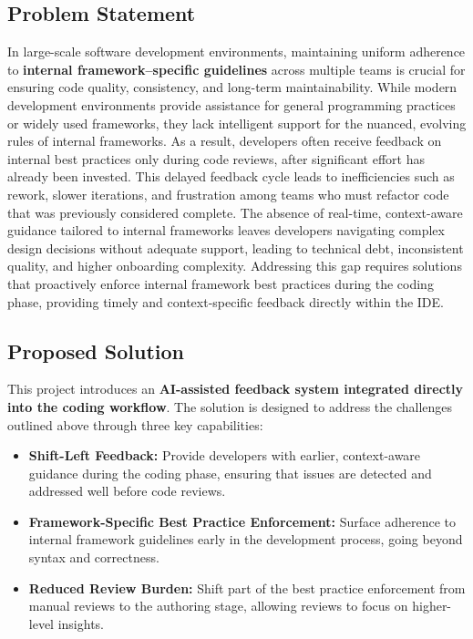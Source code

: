 \begin{spacing}{1.2}
\subsection{Problem Statement}
In large-scale software development environments, maintaining uniform adherence to \textbf{internal framework–specific guidelines} across multiple teams is crucial for ensuring code quality, consistency, and long-term maintainability. While modern development environments provide assistance for general programming practices or widely used frameworks, they lack intelligent support for the nuanced, evolving rules of internal frameworks. As a result, developers often receive feedback on internal best practices only during code reviews, after significant effort has already been invested. This delayed feedback cycle leads to inefficiencies such as rework, slower iterations, and frustration among teams who must refactor code that was previously considered complete. The absence of real-time, context-aware guidance tailored to internal frameworks leaves developers navigating complex design decisions without adequate support, leading to technical debt, inconsistent quality, and higher onboarding complexity. Addressing this gap requires solutions that proactively enforce internal framework best practices during the coding phase, providing timely and context-specific feedback directly within the IDE.  

\subsection{Proposed Solution}
This project introduces an \textbf{AI-assisted feedback system integrated directly into the coding workflow}. The solution is designed to address the challenges outlined above through three key capabilities:  

\begin{itemize}
    \item \textbf{Shift-Left Feedback:} Provide developers with earlier, context-aware guidance during the coding phase, ensuring that issues are detected and addressed well before code reviews.  
    \item \textbf{Framework-Specific Best Practice Enforcement:} Surface adherence to internal framework guidelines early in the development process, going beyond syntax and correctness.  
    \item \textbf{Reduced Review Burden:} Shift part of the best practice enforcement from manual reviews to the authoring stage, allowing reviews to focus on higher-level insights.  
\end{itemize}


\end{spacing}
